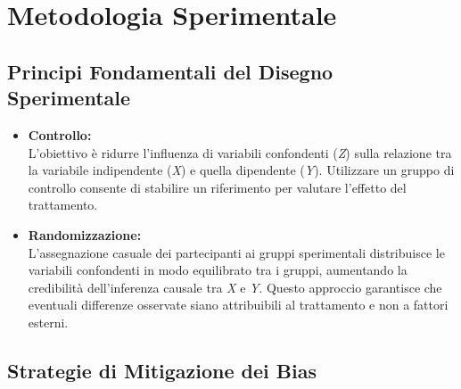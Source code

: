 \documentclass[
  letterpaper,
]{krantz}
\begin{document}
\section{Metodologia Sperimentale}\label{metodologia-sperimentale}

\subsection{Principi Fondamentali del Disegno
Sperimentale}\label{principi-fondamentali-del-disegno-sperimentale}

\begin{itemize}
\item
  \textbf{Controllo:}\\
  L'obiettivo è ridurre l'influenza di variabili confondenti (\emph{Z})
  sulla relazione tra la variabile indipendente (\emph{X}) e quella
  dipendente (\emph{Y}). Utilizzare un gruppo di controllo consente di
  stabilire un riferimento per valutare l'effetto del trattamento.
\item
  \textbf{Randomizzazione:}\\
  L'assegnazione casuale dei partecipanti ai gruppi sperimentali
  distribuisce le variabili confondenti in modo equilibrato tra i
  gruppi, aumentando la credibilità dell'inferenza causale tra \emph{X}
  e \emph{Y}. Questo approccio garantisce che eventuali differenze
  osservate siano attribuibili al trattamento e non a fattori esterni.
\end{itemize}

\subsection{Strategie di Mitigazione dei
Bias}\label{strategie-di-mitigazione-dei-bias}
\end{document}
